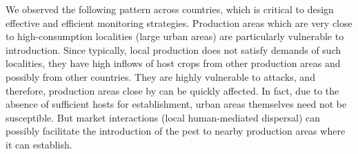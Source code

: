 \documentclass[11pt]{article}
\newcommand{\tuta}{\emph{T.~absoluta}}
\theoremstyle{definition}
\begin{document}
We observed the following pattern across countries, which is critical to
design effective and efficient monitoring strategies. Production areas
which are very close to high-consumption localities (large urban areas) are
particularly vulnerable to introduction. Since typically, local production
does not satisfy demands of such localities, they have high
inflows of host crops from other production areas and possibly from other
countries. They are highly vulnerable to attacks, and therefore, production
areas close by can be quickly affected. In fact, due to the absence of
sufficient hosts for establishment, urban areas themselves need not
be susceptible. But market interactions (local human-mediated dispersal)
can possibly facilitate the introduction of the pest to nearby production
areas where it can establish.


\end{document}
